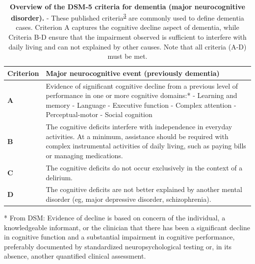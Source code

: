 \documentclass[a4paper, twoside]{templates/ociamthesis}
\begin{document}
~





\begin{table}[H]

\caption[Overview of the DSM-5 criteria for dementia (major neurocognitive disorder)]{\label{tab:diagnosticCriteria-table}\textbf{Overview of the DSM-5 criteria for dementia (major neurocognitive disorder).} - These published criteria\textsuperscript{\protect\hyperlink{ref-edition2013}{3}} are commonly used to define dementia cases. Criterion A captures the cognitive decline aspect of dementia, while Criteria B-D ensure that the impairment observed is sufficient to interfere with daily living and can not explained by other causes. Note that all criteria (A-D) must be met.}
\centering
\begin{threeparttable}
\begin{tabular}[t]{>{\centering\arraybackslash}p{5em}>{\raggedright\arraybackslash}p{27em}}
\toprule
\textbf{Criterion} & \textbf{Major neurocognitive event (previously dementia)}\\
\midrule
\textbf{A} & Evidence of significant cognitive decline from a previous level of performance in one or more cognitive domains:* \newline - Learning and memory \newline - Language \newline - Executive function \newline - Complex attention \newline - Perceptual-motor \newline - Social cognition \newline\\
\midrule
\textbf{B} & The cognitive deficits interfere with independence in everyday activities. At a minimum, assistance should be required with complex instrumental activities of daily living, such as paying bills or managing medications. \newline\\
\midrule
\textbf{C} & The cognitive deficits do not occur exclusively in the context of a delirium. \newline\\
\midrule
\textbf{D} & The cognitive deficits are not better explained by another mental disorder (eg, major depressive disorder, schizophrenia). \newline\\
\bottomrule
\end{tabular}
\begin{tablenotes}
\item[*] From DSM: Evidence of decline is based on concern of the individual, a knowledgeable informant, or the clinician that there has been a significant decline in cognitive function and a substantial impairment in cognitive performance, preferably documented by standardized neuropsychological testing or, in its absence, another quantified clinical assessment.
\end{tablenotes}
\end{threeparttable}
\end{table}
\end{document}
